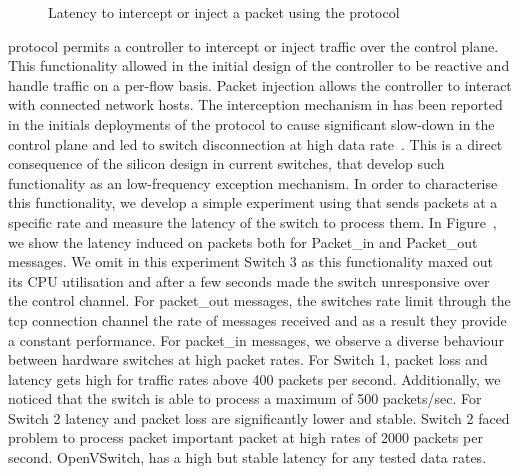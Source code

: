 \begin{figure}[ht]
  \begin{center}
  \end{center}
  \caption{Latency to intercept or inject a packet using the \of protocol}
  \label{fig:pkt_in_out_delay}
\end{figure}

\of protocol permits a controller to intercept or inject traffic over the
control plane. This functionality allowed in the initial design of the \of
controller to be reactive and handle traffic on a per-flow basis. Packet
injection allows the controller to interact with connected network hosts. The
interception mechanism in \of has been reported in the initials deployments of
the protocol to cause significant slow-down in the control plane and led to
switch disconnection at high data rate~\cite{Kobayashi:vn}. This is a direct
consequence of the silicon design in current \of switches, that develop such
functionality as an low-frequency exception mechanism. In order to characterise
this functionality, we develop a simple experiment using \oflops that sends
packets at a specific rate and measure the latency of the switch to process
them. In Figure~\cite{fig:pkt_in_out_delay}, we show the latency induced on
packets both for Packet\_in and Packet\_out messages. We omit in this experiment
Switch 3 as this functionality maxed out its CPU utilisation and after a few seconds
made the switch unresponsive over the control channel. For packet\_out messages,
the switches rate limit through the tcp connection channel the rate of messages
received and as a result they provide a constant performance. For packet\_in
messages, we observe a diverse behaviour between hardware switches at high
packet rates. For Switch 1, packet loss and latency gets high for traffic rates 
above 400 packets per second. Additionally, we noticed that the switch is able to 
process a maximum of 500 packets/sec. For Switch 2 latency and packet loss are 
significantly lower and stable. Switch 2 faced problem to process packet  
important packet at high rates of 2000 packets per second. OpenVSwitch, has a high 
but stable latency for any tested data rates. 

